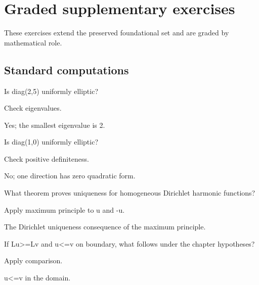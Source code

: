 \section{Graded supplementary exercises}
These exercises extend the preserved foundational set and are graded by mathematical role.

\subsection*{Standard computations}

\begin{exercise}\label{exr:iii27-expand-01}
Is diag(2,5) uniformly elliptic?
\end{exercise}
\begin{hint}
Check eigenvalues.
\end{hint}
\begin{solution}
Yes; the smallest eigenvalue is 2.
\end{solution}

\begin{exercise}\label{exr:iii27-expand-02}
Is diag(1,0) uniformly elliptic?
\end{exercise}
\begin{hint}
Check positive definiteness.
\end{hint}
\begin{solution}
No; one direction has zero quadratic form.
\end{solution}

\begin{exercise}[Uniqueness]\label{exr:iii27-expand-03}
What theorem proves uniqueness for homogeneous Dirichlet harmonic functions?
\end{exercise}
\begin{hint}
Apply maximum principle to u and -u.
\end{hint}
\begin{solution}
The Dirichlet uniqueness consequence of the maximum principle.
\end{solution}

\begin{exercise}[Comparison]\label{exr:iii27-expand-04}
If Lu>=Lv and u<=v on boundary, what follows under the chapter hypotheses?
\end{exercise}
\begin{hint}
Apply comparison.
\end{hint}
\begin{solution}
u<=v in the domain.
\end{solution}

